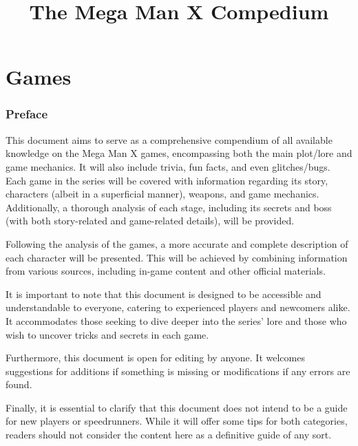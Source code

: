 \documentclass[openany]{report}
\title{The Mega Man X Compedium}
\begin{document}
\begin{titlepage}
	\maketitle
	\thispagestyle{empty}
\end{titlepage}

\tableofcontents

\part{Games}
	\section*{Preface}
	This document aims to serve as a comprehensive compendium of all available knowledge on the Mega Man X games, encompassing both the main plot/lore and game mechanics. It will also include trivia, fun facts, and even glitches/bugs. Each game in the series will be covered with information regarding its story, characters (albeit in a superficial manner), weapons, and game mechanics. Additionally, a thorough analysis of each stage, including its secrets and boss (with both story-related and game-related details), will be provided.
	
	Following the analysis of the games, a more accurate and complete description of each character will be presented. This will be achieved by combining information from various sources, including in-game content and other official materials.
	
	It is important to note that this document is designed to be accessible and understandable to everyone, catering to experienced players and newcomers alike. It accommodates those seeking to dive deeper into the series' lore and those who wish to uncover tricks and secrets in each game.
	
	Furthermore, this document is open for editing by anyone. It welcomes suggestions for additions if something is missing or modifications if any errors are found.
	
	Finally, it is essential to clarify that this document does not intend to be a guide for new players or speedrunners. While it will offer some tips for both categories, readers should not consider the content here as a definitive guide of any sort.
	
\end{document}
